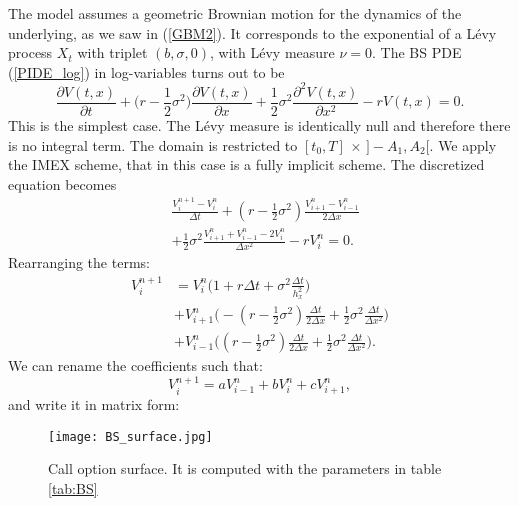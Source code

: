 The \cite{BS73} model assumes a geometric Brownian motion for the dynamics of the underlying, as we saw in (\ref{GBM2}).
It corresponds to the exponential of a Lévy process $X_t$ with triplet $(b,\sigma,0)$, with Lévy measure $\nu = 0$.
The BS PDE (\ref{PIDE_log}) in log-variables turns out to be
\begin{equation}\label{BS_PDE}
\frac{\partial  V(t,x)}{\partial t}  
          + \biggl( r -\frac{1}{2}\sigma^2 \biggr) \frac{\partial V(t,x)}{\partial x}
          + \frac{1}{2} \sigma^2 \frac{\partial^2  V(t,x)}{\partial x^2} - r  V(t,x)  = 0.
\end{equation}
This is the simplest case. The Lévy measure is identically null and therefore there is no integral term.
The domain is restricted to $[t_0,T]\, \times \, ]-A_1,A_2[$. We apply the IMEX scheme, that in this case is a fully implicit scheme.  
The discretized equation becomes
\begin{align}
&\frac{V^{n+1}_{i} -V^{n}_{i}}{\Delta t} + 
(r-\frac{1}{2}\sigma^2) \frac{V^{n}_{i+1} -V^{n}_{i-1}}{ 2 \Delta x} \\ \nonumber
&+ \frac{1}{2} \sigma^2 \frac{V^{n}_{i+1} + V^{n}_{i-1} - 2 V^{n}_{i}}{\Delta x^2}  - r V^{n}_i = 0.
\end{align}
Rearranging the terms: 
\begin{align*}
 V^{n+1}_{i} &= V^{n}_{i} \biggl( 1 + r\Delta t + \sigma^2 \frac{\Delta t}{h_x^2} \biggr)  \\
& + V^{n}_{i+1} \biggl( -(r -\frac{1}{2}\sigma^2)\frac{\Delta t}{2 \Delta x} +
\frac{1}{2}\sigma^2 \frac{\Delta t}{\Delta x^2}  \biggr)  \\
& + V^{n}_{i-1} \biggl( (r -\frac{1}{2}\sigma^2)\frac{\Delta t}{2 \Delta x} + 
\frac{1}{2}\sigma^2 \frac{\Delta t}{\Delta x^2}  \biggr).
\end{align*}
We can rename the coefficients such that:
$$ V^{n+1}_{i} = a V^{n}_{i-1} + b V^{n}_{i} + c V^{n}_{i+1}, $$
and write it in matrix form:
\begin{figure}[t]
   \centering
   \texttt{[image: BS\_surface.jpg]}
   \caption{Call option surface. It is computed with the parameters in table \ref{tab:BS}}
   \label{BS_surface} 
\end{figure}
